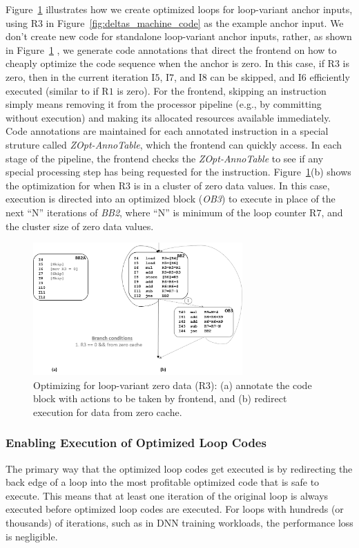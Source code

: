 Figure~\ref{fig:deltas_loop_var_opt} illustrates how we create optimized loops for loop-variant anchor inputs, using R$3$ in Figure~\ref{fig:deltas_machine_code} as the example anchor input.  We don't create new code for standalone loop-variant anchor inputs, rather, as shown in Figure~\ref{fig:deltas_loop_var_opt} , we generate code annotations that direct the frontend on how to cheaply optimize the code sequence when the anchor is zero.  In this case, if R$3$ is zero, then in the current iteration I$5$, I$7$, and I$8$ can be skipped, and I$6$ efficiently executed (similar to  if R$1$ is zero).   For the frontend, skipping an instruction simply means removing it from the processor pipeline (e.g., by committing without execution) and making its allocated resources available immediately.   Code annotations are maintained for each annotated instruction in a special struture called {\it ZOpt-AnnoTable}, which the frontend can quickly access.  In each stage of the pipeline, the frontend checks the {\it ZOpt-AnnoTable} to see if any special processing step has being requested for the instruction.   Figure~\ref{fig:deltas_loop_var_opt}(b) shows the optimization for when R$3$ is in a cluster of zero data values.  In this case, execution is directed into an optimized block ({\it OB3}) to execute in place of the next ``N'' iterations of {\it BB2}, where ``N'' is minimum of the loop counter R$7$, and the cluster size of zero data values.    
	
\begin{figure}[h]
\centering
\includegraphics[height=2in, width=.95\columnwidth]{Figures/loop-variant-zopt.png}
\caption{Optimizing for loop-variant zero data (R3):  (a) annotate the code block with actions to be taken by frontend, and (b) redirect execution for data from zero cache.}
\label{fig:deltas_loop_var_opt}
\end{figure}

\subsubsection{Enabling Execution of Optimized Loop Codes}
The primary way that the optimized loop codes get executed is by redirecting the back edge of a loop into the most profitable optimized code that is safe to execute.  This means that at least one iteration of the original loop is always executed before optimized loop codes are executed.  For loops with hundreds (or thousands) of iterations, such as in DNN training workloads, the performance loss is negligible.

